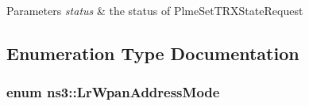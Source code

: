 \begin{DoxyParams}{Parameters}
{\em status} & the status of Plme\+Set\+T\+R\+X\+State\+Request \\
\hline
\end{DoxyParams}


\subsection{Enumeration Type Documentation}
\subsubsection[{\texorpdfstring{Lr\+Wpan\+Address\+Mode}{LrWpanAddressMode}}]{\setlength{\rightskip}{0pt plus 5cm}enum {\bf ns3\+::\+Lr\+Wpan\+Address\+Mode}}\hypertarget{group__lr-wpan_ga9ea4702ab11d5329e1593afebce06bbb}{}\label{group__lr-wpan_ga9ea4702ab11d5329e1593afebce06bbb}
